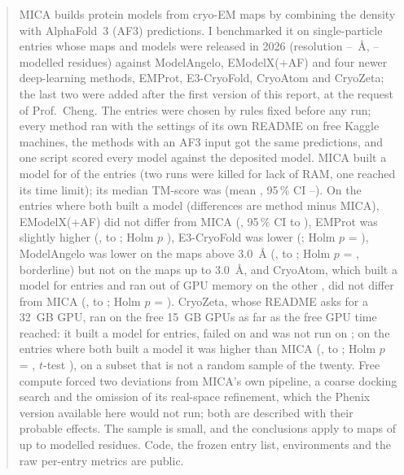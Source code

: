 \begin{abstract}
\noindent MICA builds protein models from cryo-EM maps by combining the density with AlphaFold~3 (AF3) predictions. I benchmarked it on \NEntries{} single-particle entries whose maps and models were released in 2026 (resolution \ResMin{}--\ResMax{}~\AA{}, \ResiduesMin{}--\ResiduesMax{} modelled residues) against ModelAngelo, EModelX(+AF) and four newer deep-learning methods, EMProt, E3-CryoFold, CryoAtom and CryoZeta; the last two were added after the first version of this report, at the request of Prof.\ Cheng. The entries were chosen by rules fixed before any run; every method ran with the settings of its own README on free Kaggle machines, the methods with an AF3 input got the same predictions, and one script scored every model against the deposited model. MICA built a model for \NModelMica{} of the \NEntries{} entries (two runs were killed for lack of RAM, one reached its time limit); its median TM-score was \TmMedMica{} (mean \TmMeanMica{}, 95\,\% CI \TmLoMica{}--\TmHiMica{}). On the entries where both built a model (differences are method minus MICA), EModelX(+AF) did not differ from MICA (\DiffTmEmodelx{}, 95\,\% CI \DiffLoTmEmodelx{} to \DiffHiTmEmodelx{}), EMProt was slightly higher (\DiffTmEmprot{}, \DiffLoTmEmprot{} to \DiffHiTmEmprot{}; Holm $p$ \PwHolmTmEmprot{}), E3-CryoFold was lower (\DiffTmEthree{}; Holm $p$ = \PwHolmTmEthree{}), ModelAngelo was lower on the maps above 3.0~\AA{} (\DiffTmAngeloHigh{}, \DiffLoTmAngeloHigh{} to \DiffHiTmAngeloHigh{}; Holm $p$ = \PwHolmTmAngeloHigh{}, borderline) but not on the maps up to 3.0~\AA{}, and CryoAtom, which built a model for \NModelCryoatom{} entries and ran out of GPU memory on the other \NFailedCryoatom{}, did not differ from MICA (\DiffTmCryoatom{}, \DiffLoTmCryoatom{} to \DiffHiTmCryoatom{}; Holm $p$ = \PwHolmTmCryoatom{}). CryoZeta, whose README asks for a 32~GB GPU, ran on the free 15~GB GPUs as far as the free GPU time reached: it built a model for \NModelCryozeta{} entries, failed on \NFailedCryozeta{} and was not run on \NNotRunCryozeta{}; on the \NPairsTmCryozeta{} entries where both built a model it was higher than MICA (\DiffTmCryozeta{}, \DiffLoTmCryozeta{} to \DiffHiTmCryozeta{}; Holm $p$ = \PwHolmTmCryozeta{}, $t$-test \PtHolmTmCryozeta{}), on a subset that is not a random sample of the twenty. Free compute forced two deviations from MICA's own pipeline, a coarse docking search and the omission of its real-space refinement, which the Phenix version available here would not run; both are described with their probable effects. The sample is small, and the conclusions apply to maps of up to \ResiduesMax{} modelled residues. Code, the frozen entry list, environments and the raw per-entry metrics are public.
\end{abstract}

